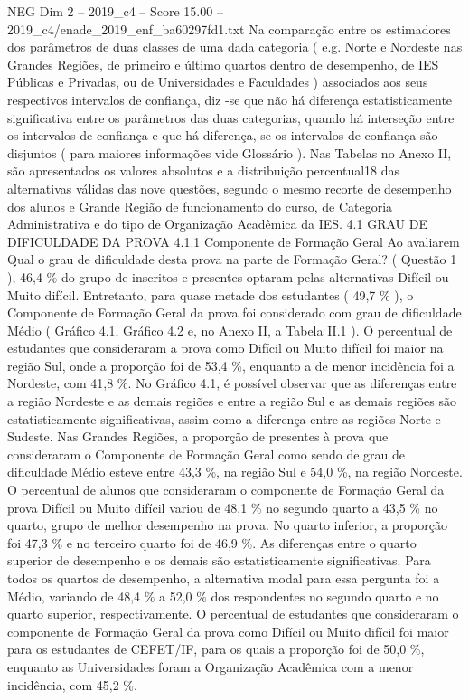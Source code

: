 \begin{textsample}{NEG Dim 2 – 2019\_c4 – Score 15.00 – 2019\_c4/enade\_2019\_enf\_ba60297fd1.txt}
Na comparação entre os estimadores dos parâmetros de duas classes de uma dada categoria ( e.g.
Norte e Nordeste nas Grandes Regiões, de primeiro e último quartos dentro de desempenho, de IES Públicas e Privadas, ou de Universidades e Faculdades ) associados aos seus respectivos intervalos de confiança, diz -se que não há diferença estatisticamente significativa entre os parâmetros das duas categorias, quando há interseção entre os intervalos de confiança e que há diferença, se os intervalos de confiança são disjuntos ( para maiores informações vide Glossário ).
Nas Tabelas no Anexo II, são apresentados os valores absolutos e a distribuição percentual18 das alternativas válidas das nove questões, segundo o mesmo recorte de desempenho dos alunos e Grande Região de funcionamento do curso, de Categoria Administrativa e do tipo de Organização Acadêmica da IES. 4.1 GRAU DE DIFICULDADE DA PROVA 4.1.1 Componente de Formação Geral Ao avaliarem Qual o grau de dificuldade desta prova na parte de Formação Geral? ( Questão 1 ), 46,4 \% do grupo de inscritos e presentes optaram pelas alternativas Difícil ou Muito difícil.
Entretanto, para quase metade dos estudantes ( 49,7 \% ), o Componente de Formação Geral da prova foi considerado com grau de dificuldade Médio ( Gráfico 4.1, Gráfico 4.2 e, no Anexo II, a Tabela II.1 ).
O percentual de estudantes que consideraram a prova como Difícil ou Muito difícil foi maior na região Sul, onde a proporção foi de 53,4 \%, enquanto a de menor incidência foi a Nordeste, com 41,8 \%.
No Gráfico 4.1, é possível observar que as diferenças entre a região Nordeste e as demais regiões e entre a região Sul e as demais regiões são estatisticamente significativas, assim como a diferença entre as regiões Norte e Sudeste.
Nas Grandes Regiões, a proporção de presentes à prova que consideraram o Componente de Formação Geral como sendo de grau de dificuldade Médio esteve entre 43,3 \%, na região Sul e 54,0 \%, na região Nordeste.
O percentual de alunos que consideraram o componente de Formação Geral da prova Difícil ou Muito difícil variou de 48,1 \% no segundo quarto a 43,5 \% no quarto, grupo de melhor desempenho na prova.
No quarto inferior, a proporção foi 47,3 \% e no terceiro quarto foi de 46,9 \%.
As diferenças entre o quarto superior de desempenho e os demais são estatisticamente significativas.
Para todos os quartos de desempenho, a alternativa modal para essa pergunta foi a Médio, variando de 48,4 \% a 52,0 \% dos respondentes no segundo quarto e no quarto superior, respectivamente.
O percentual de estudantes que consideraram o componente de Formação Geral da prova como Difícil ou Muito difícil foi maior para os estudantes de CEFET/IF, para os quais a proporção foi de 50,0 \%, enquanto as Universidades foram a Organização Acadêmica com a menor incidência, com 45,2 \%.

\end{textsample}
